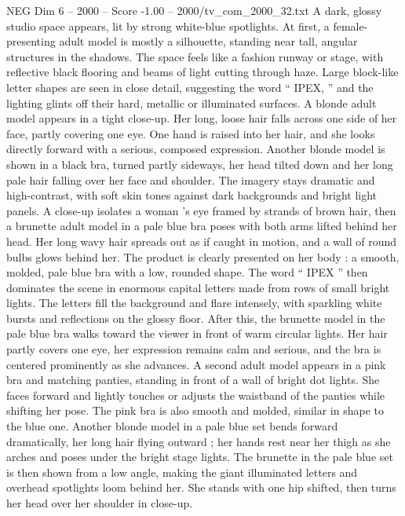 \begin{textsample}{NEG Dim 6 – 2000 – Score -1.00 – 2000/tv\_com\_2000\_32.txt}  \label{ex:f6_neg_046}
A dark, glossy studio space appears, lit by strong white-blue spotlights.
At first, a female-presenting adult model is mostly a silhouette, standing near tall, angular structures in the shadows.
The space feels like a fashion runway or stage, with reflective black flooring and beams of light cutting through haze.
Large block-like letter shapes are seen in close detail, suggesting the word “ IPEX, ” and the lighting glints off their hard, metallic or illuminated surfaces.
A blonde adult model appears in a tight close-up.
Her long, loose hair falls across one side of her face, partly covering one eye.
One hand is raised into her hair, and she looks directly forward with a serious, composed expression.
Another blonde model is shown in a black bra, turned partly sideways, her head tilted down and her long pale hair falling over her face and shoulder.
The imagery stays dramatic and high-contrast, with soft skin tones against dark backgrounds and bright light panels.
A close-up isolates a woman ’s eye framed by strands of brown hair, then a brunette adult model in a pale blue bra poses with both arms lifted behind her head.
Her long wavy hair spreads out as if caught in motion, and a wall of round bulbs glows behind her.
The product is clearly presented on her body : a smooth, molded, pale blue bra with a low, rounded shape.
The word “ IPEX ” then dominates the scene in enormous capital letters made from rows of small bright lights.
The letters fill the background and flare intensely, with sparkling white bursts and reflections on the glossy floor.
After this, the brunette model in the pale blue bra walks toward the viewer in front of warm circular lights.
Her hair partly covers one eye, her expression remains calm and serious, and the bra is centered prominently as she advances.
A second adult model appears in a pink bra and matching panties, standing in front of a wall of bright dot lights.
She faces forward and lightly touches or adjusts the waistband of the panties while shifting her pose.
The pink bra is also smooth and molded, similar in shape to the blue one.
Another blonde model in a pale blue set bends forward dramatically, her long hair flying outward ; her hands rest near her thigh as she arches and poses under the bright stage lights.
The brunette in the pale blue set is then shown from a low angle, making the giant illuminated letters and overhead spotlights loom behind her.
She stands with one hip shifted, then turns her head over her shoulder in close-up.

\end{textsample}
